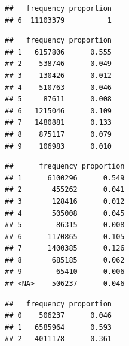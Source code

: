\documentclass[
]{article}
\newenvironment{Shaded}{\begin{snugshade}}{\end{snugshade}}
\newcommand{\CommentTok}[1]{\textcolor[rgb]{0.56,0.35,0.01}{\textit{#1}}}
\newcommand{\FunctionTok}[1]{\textcolor[rgb]{0.13,0.29,0.53}{\textbf{#1}}}
\newcommand{\NormalTok}[1]{#1}
\newcommand{\SpecialCharTok}[1]{\textcolor[rgb]{0.81,0.36,0.00}{\textbf{#1}}}
\begin{document}
\begin{Shaded}
\end{Shaded}

\begin{verbatim}
##   frequency proportion
## 6  11103379          1
\end{verbatim}

\begin{Shaded}
\end{Shaded}

\begin{verbatim}
##   frequency proportion
## 1   6157806      0.555
## 2    538746      0.049
## 3    130426      0.012
## 4    510763      0.046
## 5     87611      0.008
## 6   1215046      0.109
## 7   1480881      0.133
## 8    875117      0.079
## 9    106983      0.010
\end{verbatim}

\begin{Shaded}
\end{Shaded}

\begin{verbatim}
##      frequency proportion
## 1      6100296      0.549
## 2       455262      0.041
## 3       128416      0.012
## 4       505008      0.045
## 5        86315      0.008
## 6      1170865      0.105
## 7      1400385      0.126
## 8       685185      0.062
## 9        65410      0.006
## <NA>    506237      0.046
\end{verbatim}

\begin{Shaded}
\end{Shaded}

\begin{verbatim}
##   frequency proportion
## 0    506237      0.046
## 1   6585964      0.593
## 2   4011178      0.361
\end{verbatim}
\end{document}
